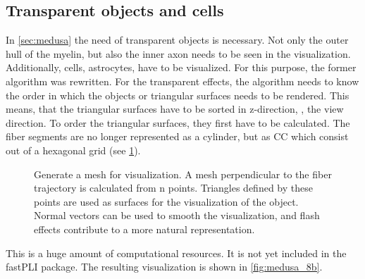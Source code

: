 \subsection{Transparent objects and cells}
%
In \cref{sec:medusa} the need of transparent objects is necessary.
Not only the outer hull of the myelin, but also the inner axon needs to be seen in the visualization.
Additionally, cells, \eg{} astrocytes, have to be visualized.
For this purpose, the former algorithm was rewritten.
For the transparent effects, the algorithm needs to know the order in which the objects or triangular surfaces needs to be rendered.
This means, that the triangular surfaces have to be sorted in z-direction, \ie{}, the view direction.
To order the triangular surfaces, they first have to be calculated.
The fiber segments are no longer represented as a cylinder, but as \ac{CC} which consist out of a hexagonal grid (see \cref{fig:vis_mesh}).
\par
%
\begin{figure}[!t]
    \centering
    \setlength{\tikzwidth}{0.75\textwidth}
	\caption[]{Generate a mesh for visualization. A mesh perpendicular to the fiber trajectory is calculated from n points. Triangles defined by these points are used as surfaces for the visualization of the object. Normal vectors can be used to smooth the visualization, and flash effects contribute to a more natural representation.}
	\label{fig:vis_mesh}
\end{figure}
%
This is a huge amount of computational resources.
It is not yet included in the \ac{fastPLI} package.
The resulting visualization is shown in \cref{fig:medusa_8b}.
%
%
%
